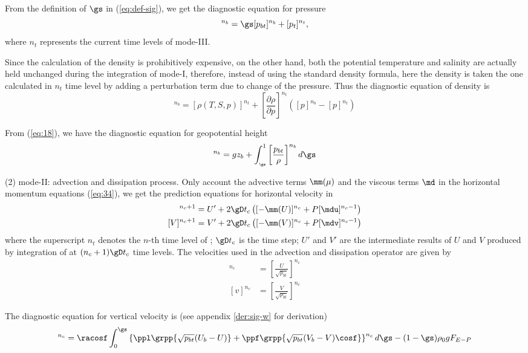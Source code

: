 From the definition of $\gs$ in (\ref{eq:def-sig}), we get the diagnostic equation
for pressure
\begin{equation}
[p]^{n_{b}}=\gs[p_{bt}]^{n_{b}}+[p_{t}]^{n_{t}},
\end{equation}
 where $n_{t}$ represents the current time levels of mode-\mbox{III}.

Since the calculation of the density is prohibitively expensive, on
the other hand, both the potential temperature and salinity are actually
held unchanged during the integration of mode-\mbox{I}, therefore,
instead of using the standard density formula, here the density is
taken the one calculated in $n_{t}$ time level by adding a perturbation
term due to change of the pressure. Thus the diagnostic equation of density is
\begin{equation}
[\rho]^{n_{b}}=[\rho(T,S,p)]^{n_{t}}+\left[\frac{\partial\rho}{\partial p}\right]^{n_{t}}([p]^{n_{b}}-[p]^{n_{t}})
\end{equation}

From (\ref{eq:18}), we have the diagnostic equation for geopotential height
\begin{equation}
[\phi]^{n_{b}}=gz_{b}+\int_{_{\gs}}^{1}\left[\frac{p_{bt}}{\rho}\right]^{n_{b}}d\gs
\end{equation}

(2) mode-\mbox{II}: advection and dissipation process. 
Only account the advective terms $\mm(\mu)$ and the viscous terms $\md$ in the
horizontal momentum equations (\ref{eq:34}), we get the prediction equations for
horizontal velocity in \modt
\bese \label{eq:43}
\begin{align}
  [U]^{n_{c}+1} &=U'+2\gD t_{c}\left([-\mm(U)]^{n_{c}}+P[\mdu]^{n_{c}-1}\right)\\
  [V]^{n_{c}+1} &=V'+2\gD t_{c}\left([-\mm(V)]^{n_{c}}+P[\mdv]^{n_{c}-1}\right)
\end{align}
\ense
where the superscript $n_{t}$ denotes the $n$-th time level of \modt;
$\gD t_{c}$ is the time step; $U'$ and $V'$ are the intermediate results of
$U$ and $V$ produced by integration of \modo at $(n_{c}+1)\gD t_{c}$ time levels.
The velocities used in the advection and dissipation operator are given by
\bese \label{eq:44}
\begin{align}
  [u]^{n_{c}} &=\left[\frac{U}{\sqrt{p_{bt}}}\right]^{n_{c}}\\
  [v]^{n_{c}} &=\left[\frac{V}{\sqrt{p_{bt}}}\right]^{n_{c}}
\end{align}
\ense

The diagnostic equation for vertical velocity is
(see appendix \ref{der:sig-w} for derivation)
\begin{equation}
[\pbt\dgs]^{n_{c}} = \racosf\int_{0}^{\gs} 
\left\{ \ppl\grpp{{\sqrt{p_{bt}}(U_{b}-U)}} + 
\ppf\grpp{\sqrt{p_{bt}}(V_{b}-V)\cosf}\right\}^{n_{c}}d\gs 
- (1-\gs)\rho_{0}gF_{E-P}
\end{equation}

